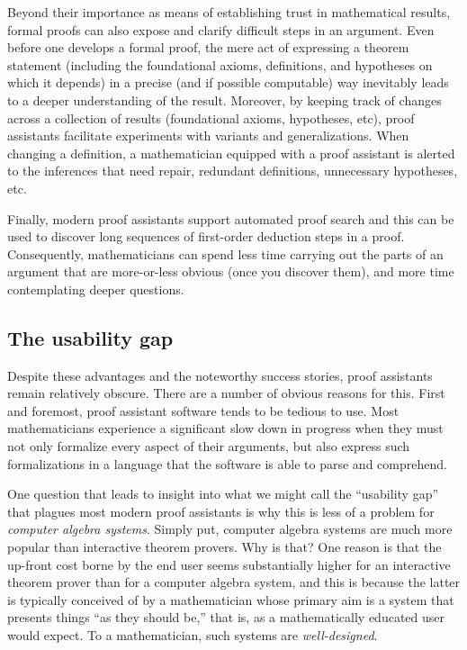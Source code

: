 \documentclass[12pt]{amsart}  %
\begin{document}
Beyond their importance as means of establishing trust in mathematical results,
formal proofs can also expose and clarify difficult steps in an argument.
Even before one develops a formal proof, the mere act of expressing a theorem statement (including the foundational axioms, definitions, and hypotheses on which it depends) in a precise (and if possible computable) way inevitably leads to a deeper understanding of the result. Moreover, by keeping track of changes across a collection of results (foundational axioms, hypotheses, etc), proof assistants facilitate experiments with variants and generalizations. When changing a definition, a mathematician equipped with a proof assistant is alerted to the inferences that need repair, redundant definitions, unnecessary hypotheses, etc.

Finally, modern proof assistants support automated proof search and this can be
used to discover long sequences of first-order deduction steps in a proof.  
Consequently, mathematicians can spend less time carrying out the parts of an 
argument that are more-or-less obvious (once you discover them), and more time 
contemplating deeper questions.


\subsection{The usability gap}
Despite these advantages and the noteworthy success stories, proof assistants remain relatively obscure. There are a number of obvious reasons for this.  First and foremost, proof assistant software tends to be tedious to use. Most mathematicians experience a significant slow down in progress when they must not only formalize every aspect of their arguments, but also express such formalizations in a language that the software is able to parse and comprehend.

One question that leads to insight into what we might call the ``usability gap'' that plagues most modern proof assistants is why this is less of a problem for
\emph{computer algebra systems}. Simply put, computer algebra systems are much more popular than interactive theorem provers. Why is that? One reason is that the up-front cost borne by the end user seems substantially higher for an interactive theorem prover than for a computer algebra system, and this is because the latter is typically conceived of by a mathematician whose primary aim is a system that presents things ``as they should be,'' that is, as a mathematically educated user would expect. To a mathematician, such systems are \emph{well-designed}. 
\end{document}
